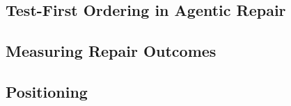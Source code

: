 \subsection{Test-First Ordering in Agentic Repair}
\label{sec:related-ordering}

\subsection{Measuring Repair Outcomes}
\label{sec:related-eval}

\subsection{Positioning}
\label{sec:related-gap}
